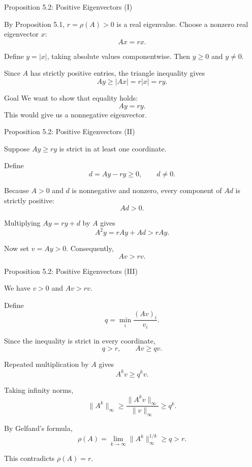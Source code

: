 \documentclass[aspectratio=169,10pt]{beamer}
\begin{document}
\begin{frame}[shrink=0]{Proposition 5.2: Positive Eigenvectors (I)}
\small

By Proposition 5.1, $r=\rho(A)>0$ is a real
eigenvalue. Choose a nonzero real eigenvector $x$:
\[
Ax=rx.
\]

Define $y=|x|$, taking absolute values
componentwise. Then $y\geq 0$ and $y\neq 0$.

Since $A$ has strictly positive entries,
the triangle inequality gives
\[
Ay\geq |Ax|=r|x|=ry.
\]

\begin{block}{Goal}
We want to show that equality holds:
\[
Ay=ry.
\]
This would give us a nonnegative eigenvector.
\end{block}

\end{frame}


\begin{frame}[shrink=0]{Proposition 5.2: Positive Eigenvectors (II)}
\small

Suppose $Ay\geq ry$ is strict in at least
one coordinate.

Define
\[
d=Ay-ry\geq0,\qquad d\neq0.
\]

Because $A>0$ and $d$ is nonnegative
and nonzero, every component of $Ad$
is strictly positive:
\[
Ad>0.
\]

Multiplying $Ay=ry+d$ by $A$ gives
\[
A^2y=rAy+Ad>rAy.
\]

Now set $v=Ay>0$. Consequently,
\[
\boxed{Av>rv.}
\]

\end{frame}


\begin{frame}[shrink=0]{Proposition 5.2: Positive Eigenvectors (III)}
\small

We have $v>0$ and $Av>rv$.

Define
\[
q=\min_i\frac{(Av)_i}{v_i}.
\]

Since the inequality is strict in every
coordinate,
\[
q>r,\qquad Av\geq qv.
\]


Repeated multiplication by $A$ gives
\[
A^kv\geq q^kv.
\]

Taking infinity norms,
\[
\|A^k\|_\infty
\geq
\frac{\|A^kv\|_\infty}{\|v\|_\infty}
\geq q^k.
\]

By Gelfand's formula,
\[
\rho(A)=\lim_{k\to\infty}
\|A^k\|_\infty^{1/k}\geq q>r.
\]

This contradicts $\rho(A)=r$.

\end{frame}
\end{document}
